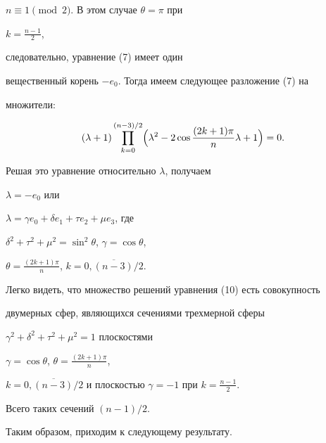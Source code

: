  


\begin{case} $n\equiv 1\pmod{2}$. В этом случае $\theta=\pi$ при 


$k=\frac{n-1}{2}$, 


следовательно, уравнение (7) имеет один 


вещественный корень $-e_0$. Тогда имеем следующее разложение (7) на 


множители: 


\begin{equation} 


(\lambda+1)\prod^{(n-3)/2}_{k=0}\Bigl(\lambda^2-2\cos 


\frac{(2k+1)\pi}{n}\lambda+1\Bigr)=0. 


\end{equation} 


Решая это уравнение относительно $\lambda$, получаем 


$\lambda=-e_0$ или 


$\lambda=\gamma e_0+\delta e_1+\tau e_2+\mu e_3$, где 


$\delta^2+\tau^2+\mu^2=\sin^2\theta$, $\gamma=\cos\theta$, 


$\theta=\frac{(2k+1)\pi}{n}$, $k=\overline{0,(n-3)/2}$. 


 


Легко видеть, что множество решений уравнения (10) есть совокупность 


двумерных сфер, являющихся сечениями трехмерной сферы 


$\gamma^2+\delta^2+\tau^2+\mu^2=1$ плоскостями 


$\gamma=\cos\theta$, $\theta=\frac{(2k+1)\pi}{n}$, 


$k=\overline{0,(n-3)/2}$ и плоскостью $\gamma=-1$ при $k=\frac{n-1}{2}$. 


Всего таких сечений $(n-1)/2$. 


\end{case} 


 


Таким образом, приходим к следующему результату.


 


